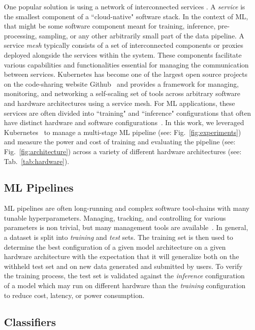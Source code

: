 \documentclass[journal]{IEEEtran}
\begin{document}
One popular solution is using a network of interconnected services \cite{panchal2024reusable,hasselbring2017microservice,zhong2022machine,singh2023load}. A \textit{service} is the smallest component of a ``cloud-native" software stack. In the context of ML, that might be some software component meant for training, inference, pre-processing, sampling, or any other arbitrarily small part of the data pipeline. 
A service \textit{mesh} typically consists of a set of interconnected components or proxies deployed alongside the services within the system.  These components facilitate various capabilities and functionalities essential for managing the communication between services. Kubernetes has become one of the largest open source projects on the code-sharing website Github~\cite{k8s-size} and provides a framework for managing, monitoring, and networking a self-scaling set of tools across arbitrary software and hardware architectures using a service mesh. For ML applications, these services are often divided into ``training" and ``inference" configurations that often have distinct hardware and software configurations~\cite{wang2019benchmarking}. In this work, we leveraged Kubernetes~\cite{k8s} to manage a multi-stage ML pipeline (see: Fig.~\ref{fig:experiments}) and measure the power and cost of training and evaluating the pipeline (see: Fig.~\ref{fig:architecture}) across a variety of different hardware architectures (see: Tab.~\ref{tab:hardware}).


\subsection{ML Pipelines}
ML pipelines are often long-running and complex software tool-chains with many tunable hyperparameters. Managing, tracking, and controlling for various parameters is non trivial, but many management tools are available~\cite{dvc,hydra,k8s}. In general, a dataset is split into \textit{training} and \textit{test} sets. The training set is then used to determine the best configuration of a given model architecture on a given hardware architecture with the expectation that it will generalize both on the withheld test set and on new data generated and submitted by users. To verify the training process, the test set is validated against the \textit{inference} configuration of a model which may run on different hardware than the \textit{training} configuration to reduce cost, latency, or power consumption. 

\subsection{Classifiers}
\end{document}
